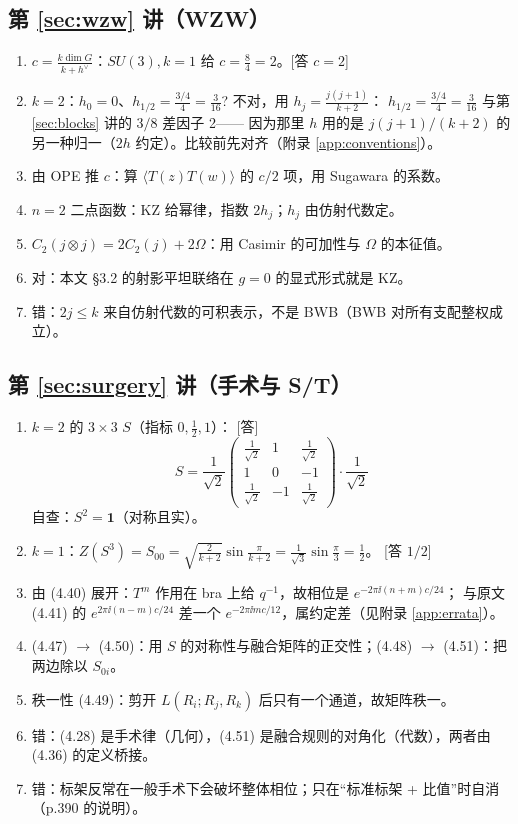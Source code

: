 \subsection*{第 \ref{sec:wzw} 讲（WZW）}
\begin{enumerate}[leftmargin=*]
  \item $c=\frac{k\dim G}{k+h^\vee}$：$SU(3),k=1$ 给 $c=\frac{8}{4}=2$。\hfill[答 $c=2$]
  \item $k=2$：$h_0=0$、$h_{1/2}=\frac{3/4}{4}=\frac{3}{16}$? 不对，用 $h_j=\frac{j(j+1)}{k+2}$：
        $h_{1/2}=\frac{3/4}{4}=\frac{3}{16}$ 与第 \ref{sec:blocks} 讲的 $3/8$ 差因子 2——
        因为那里 $h$ 用的是 $j(j+1)/(k+2)$ 的另一种归一（$2h$ 约定）。比较前先对齐（附录 \ref{app:conventions}）。
  \item 由 OPE 推 $c$：算 $\langle T(z)T(w)\rangle$ 的 $c/2$ 项，用 Sugawara 的系数。
  \item $n=2$ 二点函数：KZ 给幂律，指数 $2h_j$；$h_j$ 由仿射代数定。
  \item $C_2(j\otimes j)=2C_2(j)+2\Omega$：用 Casimir 的可加性与 $\Omega$ 的本征值。
  \item 对：本文 §3.2 的射影平坦联络在 $g=0$ 的显式形式就是 KZ。
  \item 错：$2j\le k$ 来自仿射代数的可积表示，不是 BWB（BWB 对所有支配整权成立）。
\end{enumerate}

\subsection*{第 \ref{sec:surgery} 讲（手术与 S/T）}
\begin{enumerate}[leftmargin=*]
  \item $k=2$ 的 $3\times3$ $S$（指标 $0,\frac12,1$）：
        \hfill[答]
        \[
        S=\frac{1}{\sqrt2}\begin{pmatrix}
        \frac{1}{\sqrt2} & 1 & \frac{1}{\sqrt2}\\[2pt]
        1 & 0 & -1\\[2pt]
        \frac{1}{\sqrt2} & -1 & \frac{1}{\sqrt2}
        \end{pmatrix}\cdot\frac{1}{\sqrt2}
        \]
        自查：$S^2=\mathbf 1$（对称且实）。
  \item $k=1$：$Z(S^3)=S_{00}=\sqrt{\frac{2}{k+2}}\sin\frac{\pi}{k+2}=\frac{1}{\sqrt3}\sin\frac{\pi}{3}=\frac12$。
        \hfill[答 $1/2$]
  \item 由 (4.40) 展开：$T^m$ 作用在 bra 上给 $q^{-1}$，故相位是 $e^{-2\pi\ii(n+m)c/24}$；
        与原文 (4.41) 的 $e^{2\pi\ii(n-m)c/24}$ 差一个 $e^{-2\pi\ii m c/12}$，属约定差（见附录 \ref{app:errata}）。
  \item (4.47) $\to$ (4.50)：用 $S$ 的对称性与融合矩阵的正交性；(4.48) $\to$ (4.51)：把两边除以 $S_{0i}$。
  \item 秩一性 (4.49)：剪开 $L(R_i;R_j,R_k)$ 后只有一个通道，故矩阵秩一。
  \item 错：(4.28) 是手术律（几何），(4.51) 是融合规则的对角化（代数），两者由 (4.36) 的定义桥接。
  \item 错：标架反常在一般手术下会破坏整体相位；只在“标准标架 + 比值”时自消（p.390 的说明）。
\end{enumerate}

